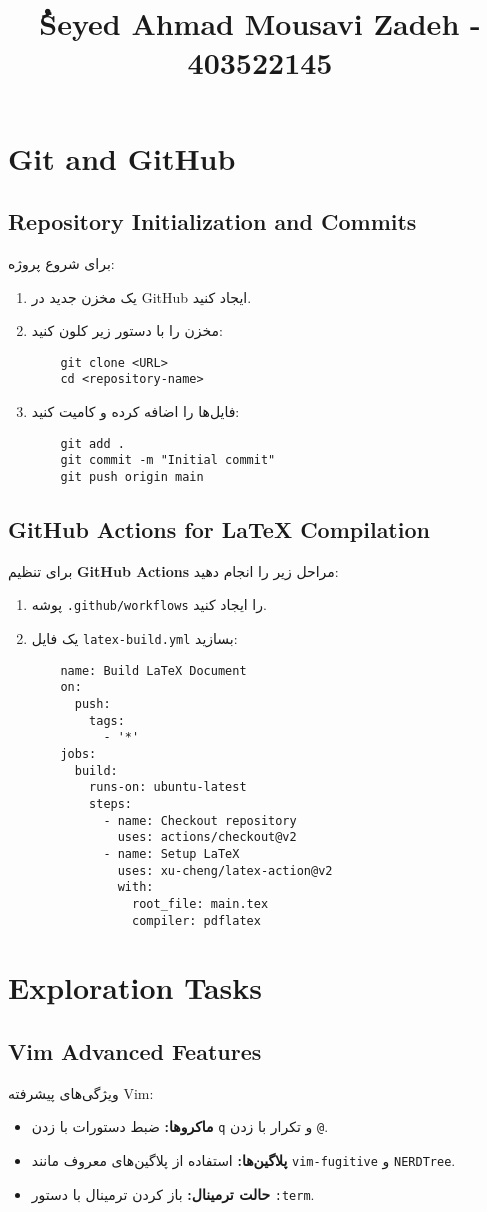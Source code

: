 \documentclass{article}
\begin{document}
\title{ُSeyed Ahmad Mousavi Zadeh - 403522145}

\section{Git and GitHub}

\subsection{Repository Initialization and Commits}
برای شروع پروژه:
\begin{enumerate}
    \item یک مخزن جدید در GitHub ایجاد کنید.
    \item مخزن را با دستور زیر کلون کنید:
    \begin{verbatim}
    git clone <URL>
    cd <repository-name>
    \end{verbatim}
    \item فایل‌ها را اضافه کرده و کامیت کنید:
    \begin{verbatim}
    git add .
    git commit -m "Initial commit"
    git push origin main
    \end{verbatim}
\end{enumerate}
\subsection{GitHub Actions for LaTeX Compilation}
برای تنظیم \textbf{GitHub Actions} مراحل زیر را انجام دهید:
\begin{enumerate}
    \item پوشه \texttt{.github/workflows} را ایجاد کنید.
    \item یک فایل \texttt{latex-build.yml} بسازید:
    \begin{verbatim}
    name: Build LaTeX Document
    on:
      push:
        tags:
          - '*'
    jobs:
      build:
        runs-on: ubuntu-latest
        steps:
          - name: Checkout repository
            uses: actions/checkout@v2
          - name: Setup LaTeX
            uses: xu-cheng/latex-action@v2
            with:
              root_file: main.tex
              compiler: pdflatex
    \end{verbatim}
\end{enumerate}
\section{Exploration Tasks}

\subsection{Vim Advanced Features}
ویژگی‌های پیشرفته Vim:
\begin{itemize}
    \item \textbf{ماکروها:} ضبط دستورات با زدن \texttt{q} و تکرار با زدن \texttt{@}.
    \item \textbf{پلاگین‌ها:} استفاده از پلاگین‌های معروف مانند \texttt{vim-fugitive} و \texttt{NERDTree}.
    \item \textbf{حالت ترمینال:} باز کردن ترمینال با دستور \texttt{:term}.
\end{itemize}
\end{document}
